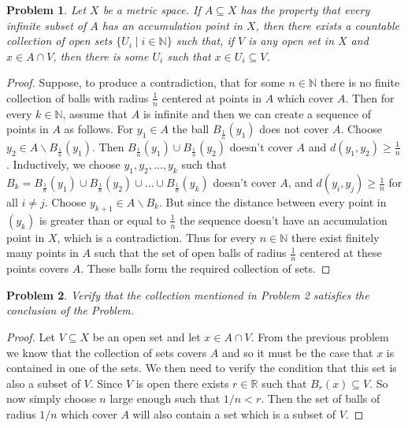 \documentclass{article}
\newtheorem{problem}{Problem}
\begin{document}
\begin{flushleft}
\begin{problem}
Let $X$ be a metric space. If $A \subseteq X$ has the property that every infinite subset of $A$ has an accumulation point in $X$, then there exists a countable collection of open sets $\{U_i \mid i \in \mathbb{N} \}$ such that, if $V$ is any open set in $X$ and $x \in A \cap V$, then there is some $U_i$ such that $x \in U_i \subseteq V$.
\end{problem}
\begin{proof}
Suppose, to produce a contradiction, that for some $n \in \mathbb{N}$ there is no finite collection of balls with radius $\frac{1}{n}$ centered at points in $A$ which cover $A$. Then for every $k \in \mathbb{N}$, assume that $A$ is infinite and then we can create a sequence of points in $A$ as follows. For $y_1 \in A$ the ball $B_{\frac{1}{n}} (y_1)$ does not cover $A$. Choose $y_2 \in A \backslash B_{\frac{1}{n}} (y_1)$. Then $B_{\frac{1}{n}} (y_1) \cup B_{\frac{1}{n}} (y_2)$ doesn't cover $A$ and $d(y_1, y_2) \geq \frac{1}{n}$. Inductively, we choose $y_1, y_2, \dots , y_k$ such that $B_k = B_{\frac{1}{n}} (y_1) \cup B_{\frac{1}{n}} (y_2) \cup \dots \cup B_{\frac{1}{n}} (y_k)$ doesn't cover $A$, and $d(y_i, y_j) \geq \frac{1}{n}$ for all $i \neq j$. Choose $y_{k+1} \in A \backslash B_k$. But since the distance between every point in $(y_k)$ is greater than or equal to $\frac{1}{n}$ the sequence doesn't have an accumulation point in $X$, which is a contradiction. Thus for every $n \in \mathbb{N}$ there exist finitely many points in $A$ such that the set of open balls of radius $\frac{1}{n}$ centered at these points covers $A$. These balls form the required collection of sets.
\end{proof}

\begin{problem}
Verify that the collection mentioned in Problem 2 satisfies the conclusion of the Problem.
\end{problem}
\begin{proof}
Let $V \subseteq X$ be an open set and let $x \in A \cap V$. From the previous problem we know that the collection of sets covers $A$ and so it must be the case that $x$ is contained in one of the sets. We then need to verify the condition that this set is also a subset of $V$. Since $V$ is open there exists $r \in \mathbb{R}$ such that $B_r (x) \subseteq V$. So now simply choose $n$ large enough such that $1/n < r$. Then the set of balls of radius $1/n$ which cover $A$ will also contain a set which is a subset of $V$.
\end{proof}


\end{flushleft}
\end{document}
